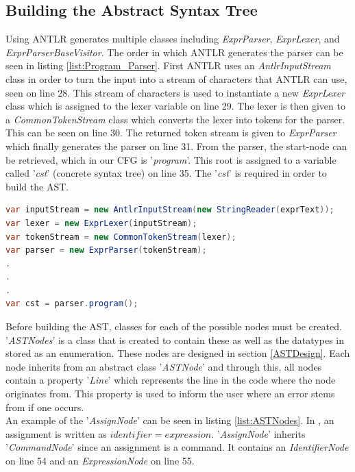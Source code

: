 \subsection{Building the Abstract Syntax Tree}
Using ANTLR generates multiple classes including \textit{ExprParser}, \textit{ExprLexer}, and \textit{ExprParserBaseVisitor}. The order in which ANTLR generates the parser can be seen in listing \ref{list:Program_Parser}. First ANTLR uses an \textit{AntlrInputStream} class in order to turn the input into a stream of characters that ANTLR can use, seen on line 28. This stream of characters is used to instantiate a new \textit{ExprLexer} class which is assigned to the lexer variable on line 29. The lexer is then given to a \textit{CommonTokenStream} class which converts the lexer into tokens for the parser. This can be seen on line 30. The returned token stream is given to \textit{ExprParser} which finally generates the parser on line 31. From the parser, the start-node can be retrieved, which in our CFG is '\textit{program}'. This root is assigned to a variable called '\textit{cst}' (concrete syntax tree) on line 35. The '\textit{cst}' is required in order to build the AST.

\begin{lstlisting}[language = csharp, label={list:Program_Parser},firstnumber=28,caption=SymbolTable Class - CobraCompiler/Program.cs]
var inputStream = new AntlrInputStream(new StringReader(exprText));
var lexer = new ExprLexer(inputStream);
var tokenStream = new CommonTokenStream(lexer);
var parser = new ExprParser(tokenStream);
.
.
.
var cst = parser.program();
\end{lstlisting}

\noindent
Before building the AST, classes for each of the possible nodes must be created. '\textit{ASTNodes}' is a class that is created to contain these as well as the datatypes in \lang stored as an enumeration. These nodes are designed in section \ref{ASTDesign}. Each node inherits from an abstract class '\textit{ASTNode}' and through this, all nodes contain a property '\textit{Line}' which represents the line in the code where the node originates from. This property is used to inform the user where an error stems from if one occurs. \\

\noindent An example of the '\textit{AssignNode}' can be seen in listing \ref{list:ASTNodes}. In \lang, an assignment is written as $identifier = expression$. '\textit{AssignNode}' inherits '\textit{CommandNode}' since an assignment is a command. It contains an \textit{IdentifierNode} on line 54 and an \textit{ExpressionNode} on line 55.

